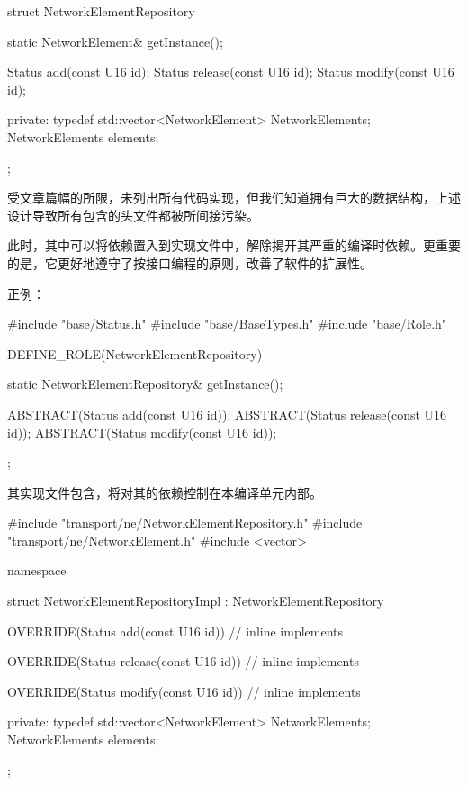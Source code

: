 \begin{content}
\begin{leftbar}
\begin{c++}
struct NetworkElementRepository
{
    static NetworkElement& getInstance();

    Status add(const U16 id);
    Status release(const U16 id);
    Status modify(const U16 id);
    
private:
    typedef std::vector<NetworkElement> NetworkElements;
    NetworkElements elements;
};
\end{c++}
\end{leftbar}

受文章篇幅的所限，未列出所有代码实现，但我们知道拥有巨大的数据结构，上述设计导致所有包含的头文件都被所间接污染。

此时，其中可以将依赖置入到实现文件中，解除揭开其严重的编译时依赖。更重要的是，它更好地遵守了按接口编程的原则，改善了软件的扩展性。

正例：
\begin{leftbar}
\begin{c++}
#include "base/Status.h"
#include "base/BaseTypes.h"
#include "base/Role.h"

DEFINE_ROLE(NetworkElementRepository)
{
    static NetworkElementRepository& getInstance();

    ABSTRACT(Status add(const U16 id));
    ABSTRACT(Status release(const U16 id));
    ABSTRACT(Status modify(const U16 id));
};
\end{c++}
\end{leftbar}

其实现文件包含，将对其的依赖控制在本编译单元内部。

\begin{leftbar}
\begin{c++}
#include "transport/ne/NetworkElementRepository.h"
#include "transport/ne/NetworkElement.h"
#include <vector>

namespace
{
    struct NetworkElementRepositoryImpl : NetworkElementRepository
    {
        OVERRIDE(Status add(const U16 id))
        {
            // inline implements
        }

        OVERRIDE(Status release(const U16 id))
        {
            // inline implements
        }

        OVERRIDE(Status modify(const U16 id))
        {
            // inline implements
        }
    
    private:
        typedef std::vector<NetworkElement> NetworkElements;
        NetworkElements elements;
    };
}


\end{c++}
\end{leftbar}
\end{content}
